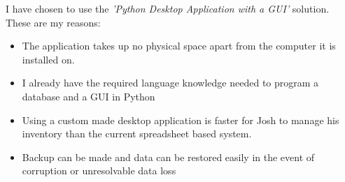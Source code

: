 I have chosen to use the \emph{'Python Desktop Application with a GUI'} solution. \\

\noindent These are my reasons:

\begin{itemize}
    \item The application takes up no physical space apart from the computer it is installed on.
    \item I already have the required language knowledge needed to program a database and a GUI in Python
    \item Using a custom made desktop application is faster for Josh to manage his inventory than the current spreadsheet based system.
    \item Backup can be made and data can be restored easily in the event of corruption or unresolvable data loss
\end{itemize}
